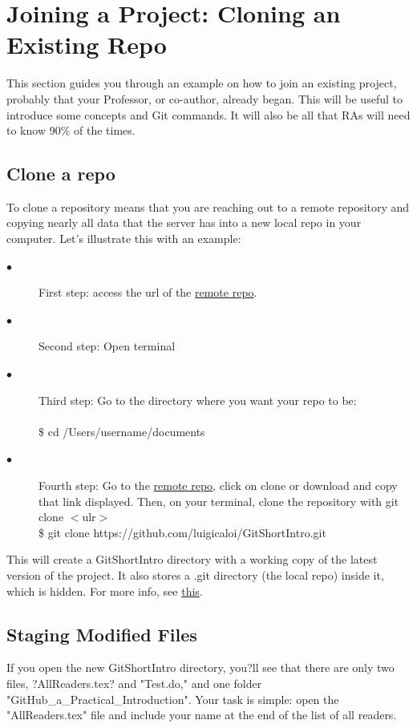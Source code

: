 \documentclass[12pt]{article}
\begin{document}
\section{Joining a Project: Cloning an Existing Repo}

    This section guides you through an example on how to join an existing project, probably that your Professor, or co-author, already began. This will be useful to introduce some concepts and Git commands. It will also be all that RAs will need to know 90\% of the times.
    
\subsection{Clone a repo}

    To clone a repository means that you are reaching out to a remote repository and copying nearly all data that the server has into a new local repo in your computer. Let's illustrate this with an example:
    \begin{description}
    \item[$\bullet$] First step: access the url of the \href{https://github.com/luigicaloi/GitShortIntro}{remote repo}.
    \item[$\bullet$] Second step: Open terminal
    \item[$\bullet$] Third step: Go to the directory where you want your repo to be: \\ \\
    \indent \$ cd /Users/username/documents 
    
    \item[$\bullet$] Fourth step: Go to the \href{https://github.com/luigicaloi/GitShortIntro}{remote repo}, click on clone or download and copy that link displayed. Then, on your terminal, clone the repository with git clone $<$ulr$>$   \\
    
    \indent \$ git clone  https://github.com/luigicaloi/GitShortIntro.git
    \vspace{0.1 in}
    \end{description}
    This will create a GitShortIntro directory with a working copy of the latest version of the project. It also stores a .git directory (the local repo) inside it, which is hidden. For more info, see \href{https://help.github.com/articles/cloning-a-repository/}{this}.
    
    \subsection{Staging Modified Files}
    If you open the new GitShortIntro directory, you?ll see that there are only two files, ?AllReaders.tex? and "Test.do," and one folder "GitHub\_a\_Practical\_Introduction". Your task is simple: open the "AllReaders.tex" file and include your name at the end of the list of all readers.
    
\end{document}
